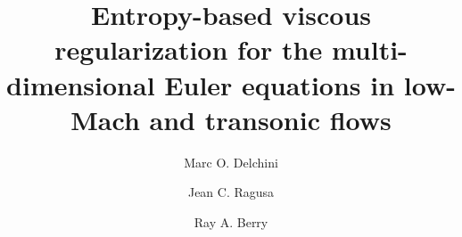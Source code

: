 \documentclass[review,10pt]{elsarticle}
\begin{document}
\begin{frontmatter}


\title{Entropy-based viscous regularization for the multi-dimensional Euler equations in low-Mach and transonic flows}
\author{Marc O. Delchini}

\author{Jean C. Ragusa}

\author{Ray A. Berry}

\address[label1]{Department of Nuclear Engineering, Texas A\&M University, College Station, TX 77843, USA }

\address[label2]{Idaho National Laboratory, Idaho Falls, ID 83415, USA }


\end{frontmatter}
\end{document}
